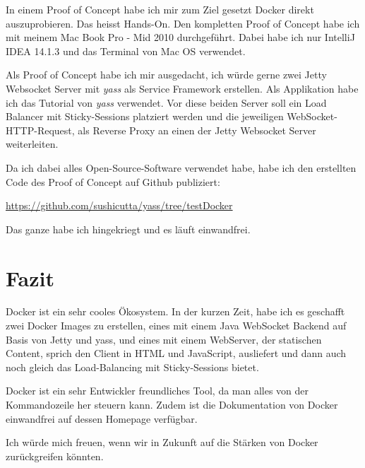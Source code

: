 In einem Proof of Concept habe ich mir zum Ziel gesetzt Docker direkt auszuprobieren. Das heisst
Hands-On. Den kompletten Proof of Concept habe ich mit meinem Mac Book Pro - Mid 2010 durchgeführt.
Dabei habe ich nur IntelliJ IDEA 14.1.3 und das Terminal von Mac OS verwendet.

Als Proof of Concept habe ich mir ausgedacht, ich würde gerne zwei Jetty Websocket Server
mit \textit{yass} als Service Framework erstellen. Als Applikation habe ich das Tutorial
von \textit{yass} verwendet. Vor diese beiden Server soll ein Load Balancer mit
Sticky-Sessions platziert werden und die jeweiligen WebSocket-HTTP-Request, als Reverse Proxy
an einen der Jetty Websocket Server weiterleiten.

Da ich dabei alles Open-Source-Software verwendet habe, habe ich den erstellten Code des Proof
of Concept auf Github publiziert:

\url{https://github.com/sushicutta/yass/tree/testDocker}

Das ganze habe ich hingekriegt und es läuft einwandfrei.
\\

\section{Fazit}

Docker ist ein sehr cooles Ökosystem. In der kurzen Zeit, habe ich es geschafft zwei Docker Images
zu erstellen, eines mit einem Java WebSocket Backend auf Basis von Jetty und yass, und eines
mit einem WebServer, der statischen Content, sprich den Client in HTML und JavaScript, ausliefert
und dann auch noch gleich das Load-Balancing mit Sticky-Sessions bietet.

Docker ist ein sehr Entwickler freundliches Tool, da man alles von der Kommandozeile her steuern
kann. Zudem ist die Dokumentation von Docker einwandfrei auf dessen Homepage verfügbar.

Ich würde mich freuen, wenn wir in Zukunft auf die Stärken von Docker zurückgreifen könnten.